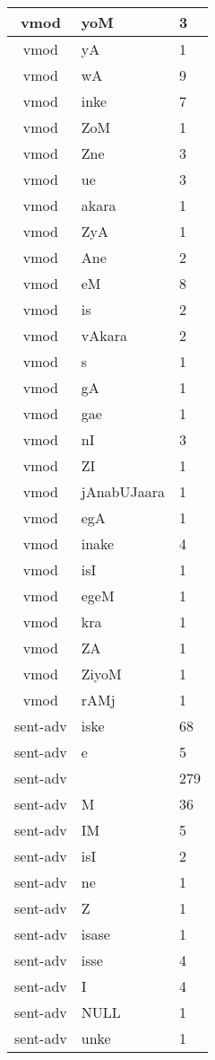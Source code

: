 \documentclass[a4 paper]{article}
\begin{document}
\begin{longtable}{cp{}p{}}
 \midrule vmod & yoM & 3\\ \midrule vmod & yA & 1\\ \midrule vmod & wA & 9\\ \midrule vmod & inke & 7\\ \midrule vmod & ZoM & 1\\ \midrule vmod & Zne & 3\\ \midrule vmod & ue & 3\\ \midrule vmod & akara & 1\\ \midrule vmod & ZyA & 1\\ \midrule vmod & Ane & 2\\ \midrule vmod & eM & 8\\ \midrule vmod & is & 2\\ \midrule vmod & vAkara & 2\\ \midrule vmod & s & 1\\ \midrule vmod & gA & 1\\ \midrule vmod & gae & 1\\ \midrule vmod & nI & 3\\ \midrule vmod & ZI & 1\\ \midrule vmod & jAnabUJaara & 1\\ \midrule vmod & egA & 1\\ \midrule vmod & inake & 4\\ \midrule vmod & isI & 1\\ \midrule vmod & egeM & 1\\ \midrule vmod & kra & 1\\ \midrule vmod & ZA & 1\\ \midrule vmod & ZiyoM & 1\\ \midrule vmod & rAMj & 1\\ \midrule 
sent-adv & iske & 68\\ \midrule sent-adv & e & 5\\ \midrule sent-adv &  & 279\\ \midrule sent-adv & M & 36\\ \midrule sent-adv & IM & 5\\ \midrule sent-adv & isI & 2\\ \midrule sent-adv & ne & 1\\ \midrule sent-adv & Z & 1\\ \midrule sent-adv & isase & 1\\ \midrule sent-adv & isse & 4\\ \midrule sent-adv & I & 4\\ \midrule sent-adv & NULL & 1\\ \midrule sent-adv & unke & 1\\ \midrule 

\end{longtable}
\end{document}
